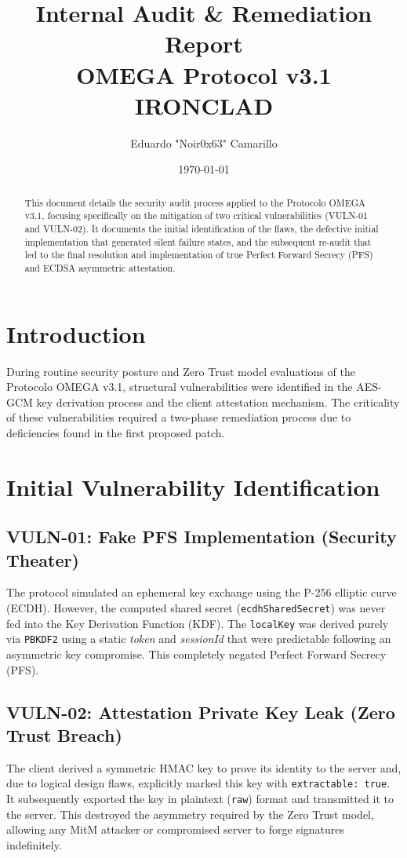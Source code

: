 \documentclass[12pt,a4paper]{article}
\title{\textbf{Internal Audit \& Remediation Report}\\ \Large OMEGA Protocol v3.1 IRONCLAD}
\author{Eduardo "Noir0x63" Camarillo}
\date{\today}
\begin{document}
\maketitle

\begin{abstract}
This document details the security audit process applied to the Protocolo OMEGA v3.1, focusing specifically on the mitigation of two critical vulnerabilities (VULN-01 and VULN-02). It documents the initial identification of the flaws, the defective initial implementation that generated silent failure states, and the subsequent re-audit that led to the final resolution and implementation of true Perfect Forward Secrecy (PFS) and ECDSA asymmetric attestation.
\end{abstract}

\tableofcontents
\newpage

\section{Introduction}
During routine security posture and Zero Trust model evaluations of the Protocolo OMEGA v3.1, structural vulnerabilities were identified in the AES-GCM key derivation process and the client attestation mechanism. The criticality of these vulnerabilities required a two-phase remediation process due to deficiencies found in the first proposed patch.

\section{Initial Vulnerability Identification}

\subsection{VULN-01: Fake PFS Implementation (Security Theater)}
The protocol simulated an ephemeral key exchange using the P-256 elliptic curve (ECDH). However, the computed shared secret (\texttt{ecdhSharedSecret}) was never fed into the Key Derivation Function (KDF). The \texttt{localKey} was derived purely via \texttt{PBKDF2} using a static \textit{token} and \textit{sessionId} that were predictable following an asymmetric key compromise. This completely negated Perfect Forward Secrecy (PFS).

\subsection{VULN-02: Attestation Private Key Leak (Zero Trust Breach)}
The client derived a symmetric HMAC key to prove its identity to the server and, due to logical design flaws, explicitly marked this key with \texttt{extractable: true}. It subsequently exported the key in plaintext (\texttt{raw}) format and transmitted it to the server. This destroyed the asymmetry required by the Zero Trust model, allowing any MitM attacker or compromised server to forge signatures indefinitely.
\end{document}

